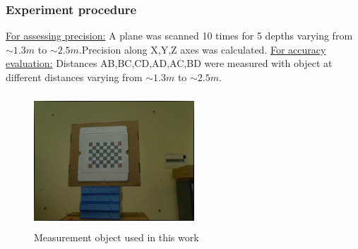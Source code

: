 \documentclass[9pt]{beamer}
\begin{document}
\begin{frame}
\frametitle{Experiment procedure}
\underline{For assessing precision:}\newline
A plane was scanned 10 times for 5 depths varying from $\sim1.3m$ to $\sim2.5m$.Precision along X,Y,Z axes was calculated.\newline
\underline{For accuracy evaluation:}\newline
Distances AB,BC,CD,AD,AC,BD were measured with object at different distances varying from $\sim1.3m$ to $\sim2.5m$.
\begin{figure}
\includegraphics[width=6cm,height=5cm]{../Thesis_work/Latex_thesis_work/img_source/measurement_object.jpg}
\caption{Measurement object used in this work}
\end{figure}
\end{frame}
\end{document}
